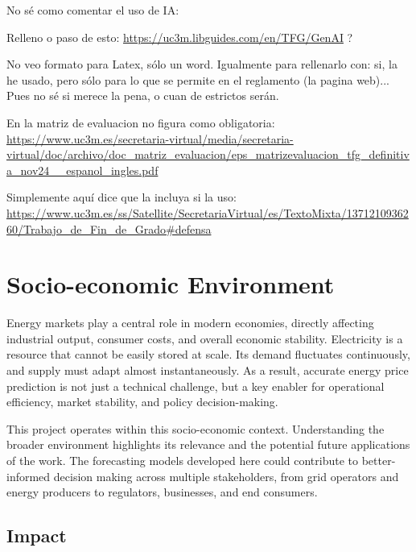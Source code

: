 \documentclass[12pt]{report} %
\begin{document}
No sé como comentar el uso de IA:



Relleno o paso de esto: \url{https://uc3m.libguides.com/en/TFG/GenAI} ?

No veo formato para Latex, sólo un word. Igualmente para rellenarlo con: si, la he usado, pero sólo para lo que se permite en el reglamento (la pagina web)... Pues no sé si merece la pena, o cuan de estrictos serán.

En la matriz de evaluacion no figura como obligatoria: \url{https://www.uc3m.es/secretaria-virtual/media/secretaria-virtual/doc/archivo/doc_matriz_evaluacion/eps_matrizevaluacion_tfg_definitiva_nov24__espanol_ingles.pdf}

Simplemente aquí dice que la incluya si la uso: \url{https://www.uc3m.es/ss/Satellite/SecretariaVirtual/es/TextoMixta/1371210936260/Trabajo_de_Fin_de_Grado#defensa}



\chapter{Socio-economic Environment}

Energy markets play a central role in modern economies, directly affecting industrial output, consumer costs, and overall economic stability. Electricity is a resource that cannot be easily stored at scale. Its demand fluctuates continuously, and supply must adapt almost instantaneously. As a result, accurate energy price prediction is not just a technical challenge, but a key enabler for operational efficiency, market stability, and policy decision-making.

This project operates within this socio-economic context. Understanding the broader environment highlights its relevance and the potential future applications of the work. The forecasting models developed here could contribute to better-informed decision making across multiple stakeholders, from grid operators and energy producers to regulators, businesses, and end consumers.


\section{Impact}
\end{document}
